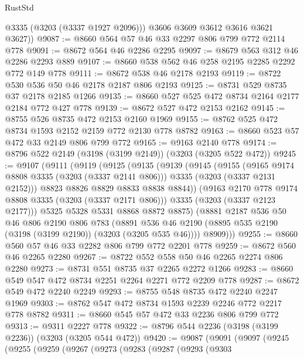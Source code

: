 \begin{lexlean}{RustStd}
\begin{coremodule}
          @3335
          (@3203 (@3337 @1927 @2096)))
        @3606
        @3609
        @3612
        @3616
        @3621
        @3627))
@9087 := @8660 @564 @57 @46 @33 @2297 @806 @799 @772 @2114 @778
@9091 := @8672 @564 @46 @2286 @2295
@9097 := @8679 @563 @312 @46 @2286 @2293 @889
@9107 := @8660 @538 @562 @46 @258 @2195 @2285 @2292 @772 @149 @778
@9111 := @8672 @538 @46 @2178 @2193
@9119 := @8722 @530 @536 @50 @46 @2178 @2187 @806 @2193
@9125 := @8731 @529 @8735 @37 @2178 @2185 @1266
@9135 := @8660 @527 @525 @472 @8734 @2164 @2177 @2184 @772 @427 @778
@9139 := @8672 @527 @472 @2153 @2162
@9145 := @8755 @526 @8735 @472 @2153 @2160 @1969
@9155 := @8762 @525 @472 @8734 @1593 @2152 @2159 @772 @2130 @778 @8782
@9163 := @8660 @523 @57 @472 @33 @2149 @806 @799 @772
@9165 := @9163 @2140 @778
@9174 := @8796 @522 @2149 (@3198 (@3199 @2149)) (@3203 (@3205 @522 @472))
@9245 := @9107
    (@9111
      (@9119
        (@9125
          (@9135
            (@9139
              (@9145
                (@9155
                  (@9165 @9174 @8808 @3335 (@3203 (@3337 @2141 @806)))
                  @3335
                  (@3203 (@3337 @2131 @2152)))
                @8823
                @8826
                @8829
                @8833
                @8838
                @8844))
            (@9163 @2170 @778 @9174 @8808 @3335 (@3203 (@3337 @2171 @806)))
            @3335
            (@3203 (@3337 @2123 @2177)))
          @5325
          @5328
          @5331
          @8868
          @8872
          @8875)
        (@8881
          @2187
          @536
          @50
          @46
          @806
          @2190
          @806
          @783
          (@8891 @536 @46 @2190 (@8895 @535 @2190 (@3198 (@3199 @2190)) (@3203 (@3205 @535 @46))))
          @8909)))
@9255 := @8660 @560 @57 @46 @33 @2282 @806 @799 @772 @2201 @778
@9259 := @8672 @560 @46 @2265 @2280
@9267 := @8722 @552 @558 @50 @46 @2265 @2274 @806 @2280
@9273 := @8731 @551 @8735 @37 @2265 @2272 @1266
@9283 := @8660 @549 @547 @472 @8734 @2251 @2264 @2271 @772 @2209 @778
@9287 := @8672 @549 @472 @2240 @2249
@9293 := @8755 @548 @8735 @472 @2240 @2247 @1969
@9303 := @8762 @547 @472 @8734 @1593 @2239 @2246 @772 @2217 @778 @8782
@9311 := @8660 @545 @57 @472 @33 @2236 @806 @799 @772
@9313 := @9311 @2227 @778
@9322 := @8796 @544 @2236 (@3198 (@3199 @2236)) (@3203 (@3205 @544 @472))
@9420 := @9087
    (@9091
      (@9097
        (@9245
          (@9255
            (@9259
              (@9267
                (@9273
                  (@9283
                    (@9287
                      (@9293
                        (@9303

\end{coremodule}
\end{lexlean}
